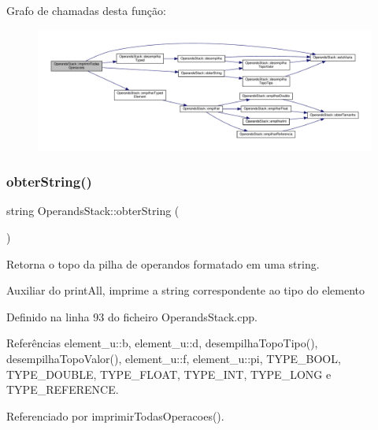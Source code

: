 Grafo de chamadas desta função\+:\nopagebreak
\begin{figure}[H]
\begin{center}
\leavevmode
\includegraphics[width=350pt]{classOperandsStack_a21ecd56a74034dbd8ed6925924cf30e6_cgraph}
\end{center}
\end{figure}
\mbox{\label{classOperandsStack_a32ad6a1ea26c02cf709fed1e86412b4a}} 
\subsubsection{\texorpdfstring{obter\+String()}{obterString()}}
{\footnotesize\ttfamily string Operands\+Stack\+::obter\+String (\begin{DoxyParamCaption}{ }\end{DoxyParamCaption})}



Retorna o topo da pilha de operandos formatado em uma string. 

Auxiliar do print\+All, imprime a string correspondente ao tipo do elemento 

Definido na linha 93 do ficheiro Operands\+Stack.\+cpp.



Referências element\+\_\+u\+::b, element\+\_\+u\+::d, desempilha\+Topo\+Tipo(), desempilha\+Topo\+Valor(), element\+\_\+u\+::f, element\+\_\+u\+::pi, T\+Y\+P\+E\+\_\+\+B\+O\+OL, T\+Y\+P\+E\+\_\+\+D\+O\+U\+B\+LE, T\+Y\+P\+E\+\_\+\+F\+L\+O\+AT, T\+Y\+P\+E\+\_\+\+I\+NT, T\+Y\+P\+E\+\_\+\+L\+O\+NG e T\+Y\+P\+E\+\_\+\+R\+E\+F\+E\+R\+E\+N\+CE.



Referenciado por imprimir\+Todas\+Operacoes().

